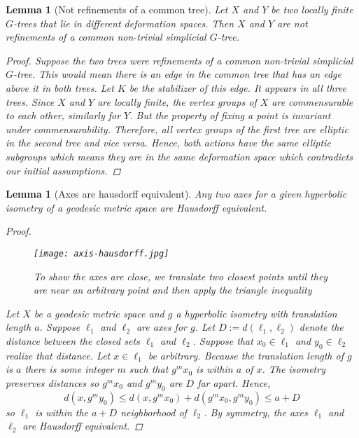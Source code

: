 \documentclass[12pt,parskip=full]{report}
\theoremstyle{plain}
\newtheorem{lem}[thm]{Lemma}
\theoremstyle{definition}
\begin{document}
\begin{lem}
    [Not refinements of a common tree]
    \label{lem:nocommonrefinement} 
    Let \(X\) and \(Y\) be two locally finite \(G\)-trees that lie in different deformation spaces. Then $X$ and $Y$ are not refinements of a common non-trivial simplicial $G$-tree.
    \begin{proof}
        Suppose the two trees were refinements of a common non-trivial simplicial $G$-tree. This would mean there is an edge in the common tree that has an edge above it in both trees. Let \(K\) be the stabilizer of this edge. It appears in all three trees. Since $X$ and $Y$ are locally finite, the vertex groups of $X$ are commensurable to each other, similarly for $Y$. But the property of fixing a point is invariant under commensurability. Therefore, all vertex groups of the first tree are elliptic in the second tree and vice versa. Hence, both actions have the same elliptic subgroups which means they are in the same deformation space which contradicts our initial assumptions.
    \end{proof}
\end{lem}

\begin{lem}
    [Axes are hausdorff equivalent]
    \label{lem:axeshausdorff}
    Any two axes for a given hyperbolic isometry of a geodesic metric space are Hausdorff equivalent.
\begin{proof}

\begin{figure}[htp]
    \centering
    \texttt{[image: axis-hausdorff.jpg]}
    \caption{To show the axes are close, we translate two closest points until they are near an arbitrary point and then apply the triangle inequality}
    \label{fig:axis-hausdorff}
\end{figure}

    Let $X$ be a geodesic metric space and $g$ a hyperbolic isometry with translation length $a$. Suppose $\ell_1$ and $\ell_2$ are axes for $g$. Let $D:= d(\ell_1,\ell_2)$ denote the distance between the closed sets $\ell_1$ and $\ell_2$. Suppose that $x_0\in\ell_1$ and $y_0\in\ell_2$ realize that distance. Let $x\in\ell_1$ be arbitrary. Because the translation length of $g$ is $a$ there is some integer $m$ such that $g^mx_0$ is within $a$ of $x$. The isometry preserves distances so $g^mx_0$ and $g^my_0$ are $D$ far apart. Hence, $$d(x, g^my_0)\leq d(x, g^mx_0) + d(g^mx_0, g^my_0)\leq a+D$$ so $\ell_1$ is within the $a+D$ neighborhood of $\ell_2$. By symmetry, the axes $\ell_1$ and $\ell_2$ are Hausdorff equivalent.
\end{proof}

\end{lem}
\end{document}
